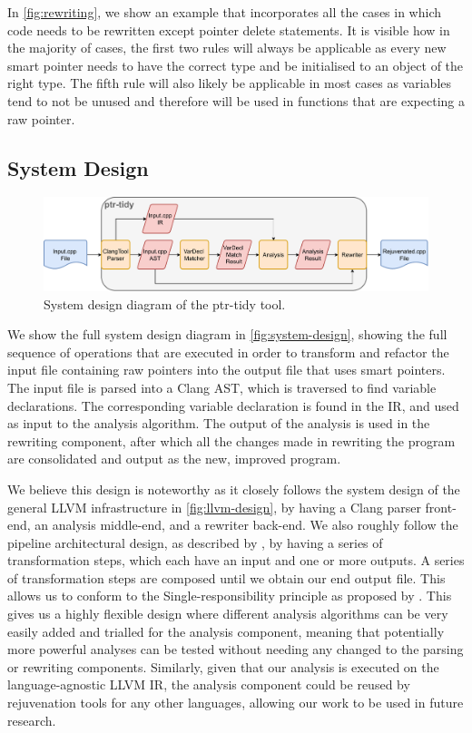 \documentclass{mpaper}
\begin{document}
    In \autoref{fig:rewriting}, we show an example that incorporates all the cases in which code needs to be rewritten except pointer delete statements.
    It is visible how in the majority of cases, the first two rules will always be applicable as every new smart pointer needs to have the correct type and be initialised to an object of the right type.
    The fifth rule will also likely be applicable in most cases as variables tend to not be
    unused and therefore will be used in functions that are expecting a raw pointer.
    
    \subsection{System Design}\label{subsec:methodology-systemdesign}
    
    \begin{figure}
        \centering
        \includegraphics[scale=0.65]{images/design.pdf}
        \caption{System design diagram of the ptr-tidy tool.}
        \label{fig:system-design}
    \end{figure}
    
    We show the full system design diagram in \autoref{fig:system-design}, showing the full sequence of operations that are executed in order to transform and refactor the input file containing raw pointers into the output file that uses smart pointers.
    The input file is parsed into a Clang AST, which is traversed to find variable declarations.
    The corresponding variable declaration is found in the IR, and used as input to the analysis algorithm.
    The output of the analysis is used in the rewriting component, after which all the changes made in rewriting the program are consolidated and output as the new, improved program.
    
    We believe this design is noteworthy as it closely follows the system design of the general LLVM infrastructure in \autoref{fig:llvm-design}, by having a Clang parser front-end, an analysis middle-end, and a rewriter back-end.
    We also roughly follow the pipeline architectural design, as described by \citet{Schmidt2013}, by having a series of transformation steps, which each have an input and one or more outputs.
    A series of transformation steps are composed until we obtain our end output file.
    This allows us to conform to the Single-responsibility principle as proposed by \citet{Martin2002}.
    This gives us a highly flexible design where different analysis algorithms can be very easily added and trialled for the analysis component, meaning that potentially more powerful analyses can be tested without needing any changed to the parsing or rewriting components. 
    Similarly, given that our analysis is executed on the language-agnostic LLVM IR, the analysis component could be reused by rejuvenation tools for any other languages, allowing our work to be used in future research.
\end{document}
